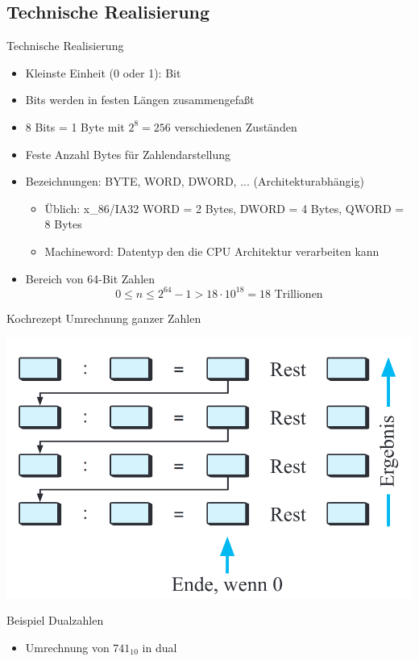 \documentclass[12pt%
,aspectratio=169%
]{beamer}
\begin{document}
\subsection{Technische Realisierung}
\begin{frame}{Technische Realisierung}
\begin{itemize}
	\item Kleinste Einheit (0 oder 1): Bit
	\item Bits werden in festen Längen zusammengefaßt
	\item 8 Bits = 1 Byte mit $2^8 = 256$ verschiedenen Zuständen
	\item Feste Anzahl Bytes für Zahlendarstellung
	\item Bezeichnungen: BYTE, WORD, DWORD, ... (Architekturabhängig)
	\begin{itemize}
		\item Üblich: x\_86/IA32 WORD = 2 Bytes, DWORD = 4 Bytes, QWORD = 8 Bytes
		\item Machineword: Datentyp den die CPU Architektur verarbeiten kann
	\end{itemize}
	\item Bereich von 64-Bit Zahlen
	$$
		0 \leq n \leq 2^{64} - 1 > 18 \cdot 10^{18} = 18 \text{ Trillionen}
	$$
\end{itemize}
\end{frame}

\begin{frame}{Kochrezept Umrechnung ganzer Zahlen}
\begin{center}
\includegraphics[scale=0.35]{pictures/konv_n}
\end{center}
\end{frame}

\begin{frame}{Beispiel Dualzahlen}
\begin{itemize}
	\item Umrechnung von $741_{10}$ in dual
\end{itemize}
\end{frame}
\end{document}
